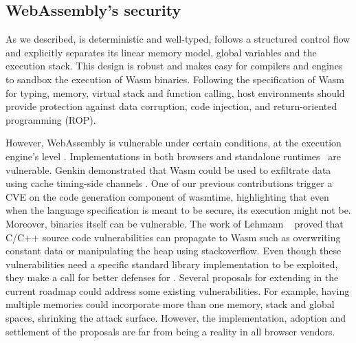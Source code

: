 






\subsection*{WebAssembly's security}

As we described, \wasm is deterministic and well-typed, follows a structured control flow and explicitly separates its linear memory model, global variables and the execution stack. This design is robust \cite{WebAssemblySecurity} and makes easy for compilers and engines to sandbox the execution of Wasm binaries. Following the specification of Wasm for typing, memory, virtual stack and function calling,
host environments should provide protection against data corruption, code injection, and return-oriented programming (ROP).

However, WebAssembly is vulnerable under certain conditions, at the execution engine's level \cite{ChromeZero}.
Implementations in both browsers and standalone runtimes~\cite{Narayan2021Swivel} are vulnerable.
Genkin \etal demonstrated that Wasm could be used to exfiltrate data using cache timing-side channels \cite{Genkin2018DrivebyKC}.
One of our previous contributions trigger a CVE on the code generation component of wasmtime, highlighting that even when the language specification is meant to be secure, its execution might not be. Moreover, binaries itself can be vulnerable. The work of Lehmann \etal ~\cite{usenixWasm2020} proved that C/C++ source code vulnerabilities can propagate to Wasm such as overwriting constant data or manipulating the heap using stackoverflow. Even though these vulnerabilities need a specific standard library implementation to be exploited, they make a call for better defenses for \wasm. 
Several proposals for extending \wasm in the current roadmap could address some existing vulnerabilities. For example, having multiple memories could incorporate more than one memory, stack and global spaces, shrinking the attack surface. However, the implementation, adoption and settlement of the proposals are far from being a reality in all browser vendors.


